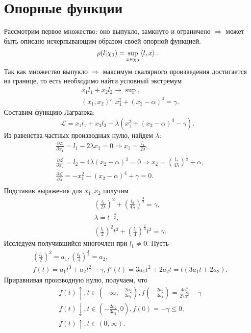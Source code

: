 \documentclass[11pt]{article}
\begin{document}
\section{Опорные функции}
Рассмотрим первое множество: оно выпукло, замкнуто и ограничено $\Rightarrow$ может быть
описано исчерпывающим образом своей опорной функцией.
\[
\rho(l | \chi_0) = \sup_{x \in \chi_0}\left<l,x\right>.
\] 
Так как множество выпукло $\Rightarrow$ 
максимум скалярного произведения достигается на границе, то есть необходимо найти условный экстремум
\begin{equation}\label{condExtr}
\begin{aligned}
& x_1l_1 + x_2l_2 \rightarrow \sup,
\\
& \left(x_1, x_2\right)' : x_1^2 + (x_2-\alpha)^4 = \gamma.
\end{aligned}
\end{equation}  
Составим функцию Лагранжа:
\[
\mathcal{L} = x_1l_1 + x_2l_2 - \lambda \left(x_1^2 + (x_2-\alpha)^4 - \gamma   \right).
\]
Из равенства частных производных нулю, найдем $\lambda:$
\[
\begin{aligned}
&\frac{\partial\mathcal{L}}{\partial x_1} = l_1 - 2\lambda x_1 = 0 
\Rightarrow x_1 = \frac{l_1}{2\lambda},
\\
&\frac{\partial\mathcal{L}}{\partial x_2} = l_2 - 4\lambda \left(x_2 - \alpha \right)^3 = 0 
\Rightarrow x_2 = \left( \frac{l_2}{4\lambda} \right)^{\frac{1}{3}} + \alpha,
\\
& \frac{\partial\mathcal{L}}{\partial \lambda} = -x_1^2 - (x_2-\alpha)^4 + \gamma = 0.
\\
\end{aligned}
\]
Подставив выражения для $x_1, x_2$ получим
\[
\begin{aligned}
&\left(\frac{l_1}{2\lambda}  \right) ^ 2 + \left(\frac{l_2}{4\lambda}  \right)^{\frac{4}{3}} = \gamma,
\\
& \lambda = t^{-\frac{3}{2}},
\\
& \left(\frac{l_1}{2}   \right)^2 t^3 + \left(\frac{l_2}{4}\right)^{\frac{4}{3}}t^2 = \gamma.
\end{aligned}
\]
Исследуем получившийся многочлен при $l_1 \ne 0$. Пусть
\[
\begin{aligned}
&\left(\frac{l_1}{2}  \right) ^ 2 = a_1, \left(\frac{l_2}{4}  \right)^{\frac{4}{3}} = a_2,
\\
& f(t) = a_1t^3 + a_2t^2 - \gamma, f'(t) = 3a_1t^2 + 2a_2t = t(3a_1t+2a_2).
\end{aligned}
\]
Приравнивая производную нулю, получаем, что
\[
\begin{aligned}
&f(t) \uparrow,  t \in \left(-\infty, -\frac{2a_2}{3a_1}  \right), f(-\frac{2a_2}{3a_1}) = \frac{4a_2^3}{27a_1^2} - \gamma
\\
&f(t) \downarrow , t \in \left(-\frac{2a_2}{3a_1}, 0  \right), f(0) = -\gamma \le 0,
\\
&f(t) \uparrow , t \in \left(0 , \infty \right).
\end{aligned}
\]
\end{document}
